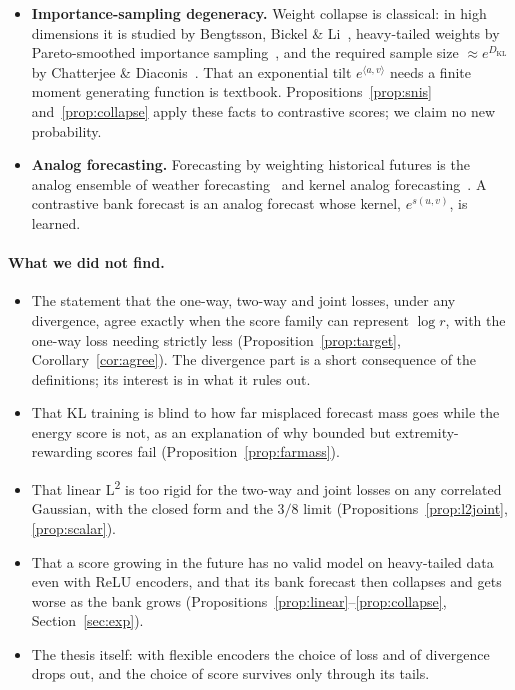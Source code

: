 \documentclass[11pt]{article}
\newcommand{\Ltwo}{L\textsuperscript{2}}
\newcommand{\KL}{D_{\mathrm{KL}}}
\theoremstyle{plain}
\theoremstyle{definition}
\theoremstyle{remark}
\begin{document}
\begin{itemize}
  sharp~\cite{simclr,wangisola}. Negative squared Euclidean distance logits (our \Ltwo{}) are
  used in practice and match or beat cosine CLIP~\cite{euclip}. None of these ties
  boundedness to the \emph{existence} of the model or to the behaviour of a reweighted bank.
\item \textbf{Importance-sampling degeneracy.} Weight collapse is classical: in high
  dimensions it is studied by Bengtsson, Bickel \& Li~\cite{bbl}, heavy-tailed weights by
  Pareto-smoothed importance sampling~\cite{psis}, and the required sample size
  $\approx e^{\KL}$ by Chatterjee \& Diaconis~\cite{cd}. That an exponential tilt $e^{\langle a,v\rangle}$
  needs a finite moment generating function is textbook. Propositions~\ref{prop:snis}
  and~\ref{prop:collapse} apply these facts to contrastive scores; we claim no new probability.
\item \textbf{Analog forecasting.} Forecasting by weighting historical futures is the analog
  ensemble of weather forecasting~\cite{anen} and kernel analog forecasting~\cite{kaf}. A
  contrastive bank forecast is an analog forecast whose kernel, $e^{s(u,v)}$, is learned.
\end{itemize}

\paragraph{What we did not find.}
\begin{itemize}
\item The statement that the one-way, two-way and joint losses, under any divergence, agree
  exactly when the score family can represent $\log r$, with the one-way loss needing strictly
  less (Proposition~\ref{prop:target}, Corollary~\ref{cor:agree}). The divergence part is a
  short consequence of the definitions; its interest is in what it rules out.
\item That KL training is blind to how far misplaced forecast mass goes while the energy
  score is not, as an explanation of why bounded but extremity-rewarding scores fail
  (Proposition~\ref{prop:farmass}).
\item That linear \Ltwo{} is too rigid for the two-way and joint losses on any correlated
  Gaussian, with the closed form and the $3/8$ limit (Propositions~\ref{prop:l2joint},
  \ref{prop:scalar}).
\item That a score growing in the future has no valid model on heavy-tailed data even with
  ReLU encoders, and that its bank forecast then collapses and gets worse as the bank grows
  (Propositions~\ref{prop:linear}--\ref{prop:collapse}, Section~\ref{sec:exp}).
\item The thesis itself: with flexible encoders the choice of loss and of divergence drops
  out, and the choice of score survives only through its tails.
\end{itemize}
\end{document}
